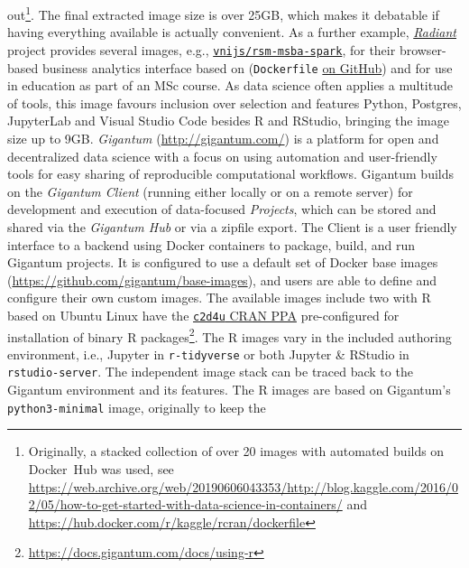 out\footnote{Originally, a stacked collection of over 20 images with automated builds on Docker~Hub was used, see \href{https://web.archive.org/web/20190606043353/http://blog.kaggle.com/2016/02/05/how-to-get-started-with-data-science-in-containers/}{https://web.archive.org/web/20190606043353/http://blog.kaggle.com/2016/02/05/how-to-get-started-with-data-science-in-containers/} and \href{https://hub.docker.com/r/kaggle/rcran/dockerfile}{https://hub.docker.com/r/kaggle/rcran/dockerfile}}.
The final extracted image size is over 25GB, which makes it debatable if
having everything available is actually convenient. As a further
example, \href{https://radiant-rstats.github.io/docs/}{\emph{Radiant}}
project provides several images, e.g.,
\href{https://hub.docker.com/r/vnijs/rsm-msba-spark}{\texttt{vnijs/rsm-msba-spark}},
for their browser-based business analytics interface based on
 (\texttt{Dockerfile}
\href{https://github.com/radiant-rstats/docker}{on GitHub}) and for use
in education as part of an MSc course. As data science often applies a
multitude of tools, this image favours inclusion over selection and
features Python, Postgres, JupyterLab and Visual Studio Code besides R
and RStudio, bringing the image size up to 9GB. \emph{Gigantum}
(\url{http://gigantum.com/}) is a platform for open and decentralized
data science with a focus on using automation and user-friendly tools
for easy sharing of reproducible computational workflows. Gigantum
builds on the \emph{Gigantum Client} (running either locally or on a
remote server) for development and execution of data-focused
\emph{Projects}, which can be stored and shared via the \emph{Gigantum
Hub} or via a zipfile export. The Client is a user friendly interface to
a backend using Docker containers to package, build, and run Gigantum
projects. It is configured to use a default set of Docker base images
(\url{https://github.com/gigantum/base-images}), and users are able to
define and configure their own custom images. The available images
include two with R based on Ubuntu Linux have the
\href{https://launchpad.net/~marutter/+archive/ubuntu/c2d4u3.5/}{\texttt{c2d4u}
CRAN PPA} pre-configured for installation of binary R
packages\footnote{\href{https://docs.gigantum.com/docs/using-r}{https://docs.gigantum.com/docs/using-r}}.
The R images vary in the included authoring environment, i.e., Jupyter
in \texttt{r-tidyverse} or both Jupyter \& RStudio in
\texttt{rstudio-server}. The independent image stack can be traced back
to the Gigantum environment and its features. The R images are based on
Gigantum's \texttt{python3-minimal} image, originally to keep the
